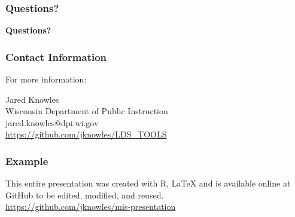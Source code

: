 \documentclass{beamer}
\begin{document}
{
\begin{frame}[plain]
\frametitle{Questions?}
\vspace{.6in}
\begin{flushright}
\Huge \textbf{Questions?}
\end{flushright}
\vspace{.14in}
\end{frame}
}


\begin{frame}
\frametitle{Contact Information}
\Large For more information:
\vspace{.1in}
\begin{center}
\large Jared Knowles \\
Wisconsin Department of Public Instruction \\
jared.knowles@dpi.wi.gov \\
\textcolor{blue}{\href{https://github.com/jknowles/LDS_TOOLS}{https://github.com/jknowles/LDS\_TOOLS}} \\
\end{center}
\end{frame}

\begin{frame}
\frametitle{Example}
\vspace{.3in}
\large This entire presentation was created with R, \LaTeX{} and is available online at GitHub to be edited, modified, and reused. \\
\textcolor{blue}{\href{https://github.com/jknowles/mis-presentation}{https://github.com/jknowles/mis-presentation}}
\end{frame}
\end{document}
